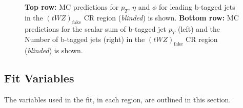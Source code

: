 \begin{figure}[htbp]
    \caption{\textbf{Top row:} MC predictions for $p_{T}$, $\eta$ and $\phi$ for leading b-tagged jets in the $(tWZ)_{\text{fake}}$ CR region (\textit{blinded}) is shown. \textbf{Bottom row:} MC predictions for the scalar sum of b-tagged jet $p_{T}$ (left) and the Number of b-tagged jets (right) in the $(tWZ)_{\text{fake}}$ CR region (\textit{blinded}) is shown.}
  \label{fig:4lep-tWZ-fake-CR-bjetPlots}
\end{figure}


\subsection{Fit Variables}



The variables used in the fit, in each region, are outlined in this section.

